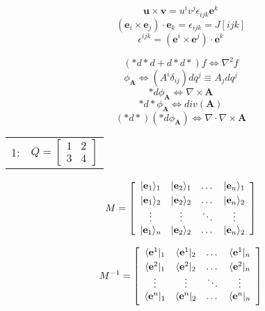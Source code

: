 \documentclass[10pt]{article}
\begin{document}





\null
\[
  {\mathbf u} \times {\mathbf v} = u^i v^j \epsilon_{ijk} {\mathbf e}^k
\]
\[
   ( {\mathbf e}_i \times {\mathbf e}_j ) \cdot {\mathbf e}_k =  \epsilon_{ijk} = J [ijk]
\]
\[
  \epsilon^{ijk} = ({\mathbf e}^i \times {\mathbf e}^j) \cdot {\mathbf e}^k 
\]

\[
(*d*d + d*d*) f \Leftrightarrow \nabla^2 f
\]
\[
  \phi_{\mathbf A} \Leftrightarrow \left( A^i \delta_{ij} \right) dq^j \equiv A_j dq^j
\]
\[
  * d \phi_{\mathbf A} \Leftrightarrow \nabla \times {\mathbf A}
\]
\[
  *d* \phi_{\mathbf A} \Leftrightarrow div({\mathbf A})
\]
\[
(*d*)(*d \phi_{\mathbf A} ) \Leftrightarrow \nabla \cdot \nabla \times {\mathbf A}
\]
\newpage
\null

\begin{tabular}{cc}
  1: & $Q = \left[ \begin{array}{cc}
               1 & 2 \\
			   3 & 4
			 \end{array} \right]$
\end{tabular}

\[
  M = \left[ \begin{array}{cccc}
		|{\mathbf e}_1 \rangle_1 &  | {\mathbf e}_2 \rangle_1 & \dots & | {\mathbf e}_n \rangle_1 \vspace{1mm}\\
		|{\mathbf e}_1 \rangle_2 &  | {\mathbf e}_2 \rangle_2 & \dots & | {\mathbf e}_n \rangle_2 \\
		\vdots                   &     \vdots                 & \ddots &   \vdots \\
		|{\mathbf e}_1 \rangle_n &  | {\mathbf e}_2 \rangle_2 & \dots & | {\mathbf e}_n \rangle_2 \\
	  \end{array} \right]
\]

\[
  M^{-1} = \left[ \begin{array}{cccc}
		    \langle{\mathbf e}^1 |_1 &  \langle{\mathbf e}^1 |_2 & \dots & \langle{\mathbf e}^1 |_n \vspace{1mm}\\
		    \langle{\mathbf e}^2 |_1 &  \langle{\mathbf e}^2 |_2 & \dots & \langle{\mathbf e}^2 |_n \\
	    	\vdots                   &     \vdots                 & \ddots &   \vdots \\
		    \langle{\mathbf e}^n |_1 &  \langle{\mathbf e}^n |_2 & \dots & \langle{\mathbf e}^n |_n \vspace{1mm}\\
	  \end{array} \right]
\]
\end{document}
